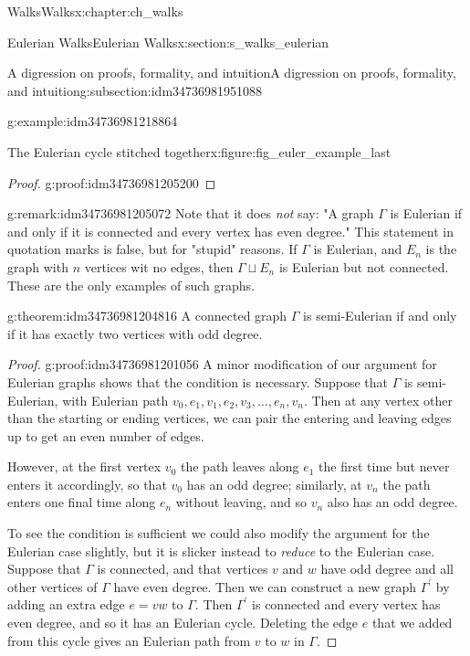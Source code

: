 \documentclass[oneside,10pt,]{book}
\numberwithin{equation}{section}
\begin{document}
\begin{chapterptx}{Walks}{}{Walks}{}{}{x:chapter:ch_walks}
\begin{sectionptx}{Eulerian Walks}{}{Eulerian Walks}{}{}{x:section:s_walks_eulerian}
\begin{subsectionptx}{A digression on proofs, formality, and intuition}{}{A digression on proofs, formality, and intuition}{}{}{g:subsection:idm34736981951088}
\begin{example}{}{g:example:idm34736981218864}
\begin{figureptx}{The Eulerian cycle stitched together}{x:figure:fig_euler_example_last}{}
\begin{image}{0.15}{0.7}{0.15}
{\begin{tikzpicture}[scale=2]
\end{tikzpicture}
}%
\end{image}%
\tcblower
\end{figureptx}%
\end{example}
\begin{proof}{}{g:proof:idm34736981205200}
\end{proof}
\begin{remark}{}{g:remark:idm34736981205072}%
Note that it does \emph{not} say: "A graph \(\Gamma\) is Eulerian if and only if it is connected and every vertex has even degree." This statement in quotation marks is false, but for "stupid" reasons.  If \(\Gamma\) is Eulerian, and \(E_n\) is the graph with \(n\) vertices wit no edges, then \(\Gamma\sqcup E_n\) is Eulerian but not connected.  These are the only examples of such graphs.%
\end{remark}
\begin{theorem}{}{}{g:theorem:idm34736981204816}%
A connected graph \(\Gamma\) is semi-Eulerian if and only if it has exactly two vertices with odd degree.%
\end{theorem}
\begin{proof}{}{g:proof:idm34736981201056}
A minor modification of our argument for Eulerian graphs shows that the condition is necessary.  Suppose that \(\Gamma\) is semi-Eulerian, with Eulerian path \(v_0, e_1, v_1,e_2,v_3,\dots,e_n,v_n\).  Then at any vertex other than the starting or ending vertices, we can pair the entering and leaving edges up to get an even number of edges.%
\par
However, at the first vertex \(v_0\) the path leaves along \(e_1\) the first time but never enters it accordingly, so that \(v_0\) has an odd degree; similarly, at \(v_n\) the path enters one final time along \(e_n\) without leaving, and so \(v_n\) also has an odd degree.%
\par
To see the condition is sufficient we could also modify the argument for the Eulerian case slightly, but it is slicker instead to \emph{reduce} to the Eulerian case.  Suppose that \(\Gamma\) is connected, and that vertices \(v\) and \(w\) have odd degree and all other vertices of \(\Gamma\) have even degree.  Then we can construct a new graph \(\Gamma^\prime\) by adding an extra edge \(e=vw\) to \(\Gamma\).  Then \(\Gamma^\prime\) is connected and every vertex has even degree, and so it has an Eulerian cycle.  Deleting the edge \(e\) that we added from this cycle gives an Eulerian path from \(v\) to \(w\) in \(\Gamma\).%
\end{proof}

\end{subsectionptx}
\end{sectionptx}
\end{chapterptx}
\end{document}
